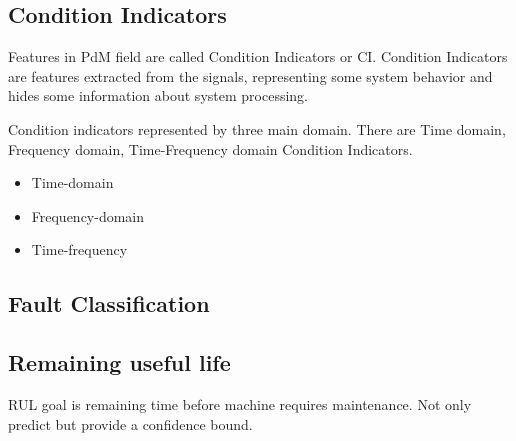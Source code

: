 
\subsection{Condition Indicators}
Features in PdM field are called Condition Indicators or CI.
Condition Indicators are features extracted from the signals, representing some
system behavior and hides some information about system processing.

Condition indicators represented by three main domain. There are Time
domain, Frequency domain, Time-Frequency domain Condition Indicators.

\begin{itemize}
    \item Time-domain
    \item Frequency-domain
    \item Time-frequency
\end{itemize}

\subsection{Fault Classification}

\subsection{Remaining useful life}
RUL goal is remaining time before machine requires maintenance. Not only
predict but provide a confidence bound.

